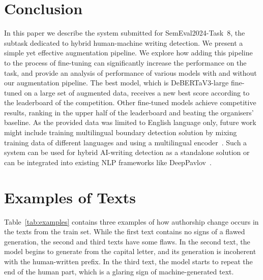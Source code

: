 \documentclass[11pt]{article}
\begin{document}
\section{Conclusion}
In this paper we describe the system submitted for SemEval2024-Task~8, the subtask dedicated to hybrid human-machine writing detection. We present a simple yet effective augmentation pipeline. We explore how adding this pipeline to the process of fine-tuning can significantly increase the performance on the task, and provide an analysis of performance of various models with and without our augmentation pipeline. The best model, which is DeBERTaV3-large fine-tuned on a large set of augmented data, receives a new best score according to the leaderboard of the competition. Other fine-tuned models achieve competitive results, ranking in the upper half of the leaderboard and beating the organisers' baseline. As the provided data was limited to English language only, future work might include training multilingual boundary detection solution by mixing training data of different languages and using a multilingual encoder~\cite{chizhikova2022multilingual}. Such a system can be used for hybrid AI-writing detection as a standalone solution or can be integrated into existing NLP frameworks like DeepPavlov~\cite{burtsev2018deeppavlov}.



\appendix


\section{Examples of Texts}
\label{appendix:examples}

Table~\ref{tab:examples} contains three examples of how authorship change occurs in the texts from the train set. While the first text contains no signs of a flawed generation, the second and third texts have some flaws. In the second text, the model begins to generate from the capital letter, and its generation is incoherent with the human-written prefix. In the third text, the model starts to repeat the end of the human part, which is a glaring sign of machine-generated text.
\end{document}
